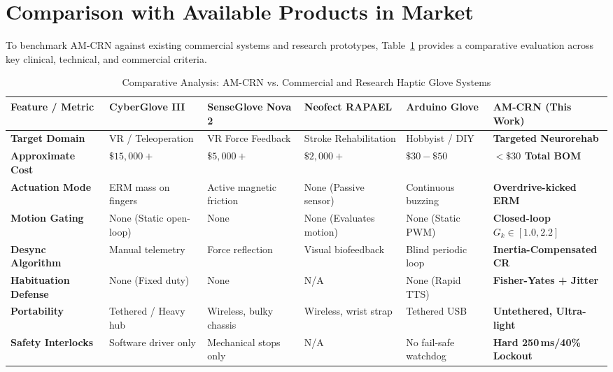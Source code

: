 \documentclass[10pt,twocolumn]{article}
\begin{document}
\section{Comparison with Available Products in Market}
To benchmark AM-CRN against existing commercial systems and research prototypes, Table~\ref{tab:market} provides a comparative evaluation across key clinical, technical, and commercial criteria.

\begin{table}[t]
\centering
\caption{Comparative Analysis: AM-CRN vs. Commercial and Research Haptic Glove Systems}
\label{tab:market}
\footnotesize
\begin{tabularx}{\textwidth}{l X X X X X}
\toprule
\textbf{Feature / Metric} & \textbf{CyberGlove III} & \textbf{SenseGlove Nova 2} & \textbf{Neofect RAPAEL} & \textbf{Arduino Glove} & \textbf{AM-CRN (This Work)} \\
\midrule
\textbf{Target Domain} & VR / Teleoperation & VR Force Feedback & Stroke Rehabilitation & Hobbyist / DIY & \textbf{Targeted Neurorehab} \\
\textbf{Approximate Cost} & $\$15,000+$ & $\$5,000+$ & $\$2,000+$ & $\$30 - \$50$ & \textbf{$<\$30$ Total BOM} \\
\textbf{Actuation Mode} & ERM mass on fingers & Active magnetic friction & None (Passive sensor) & Continuous buzzing & \textbf{Overdrive-kicked ERM} \\
\textbf{Motion Gating} & None (Static open-loop) & None & None (Evaluates motion) & None (Static PWM) & \textbf{Closed-loop $G_k \in [1.0, 2.2]$} \\
\textbf{Desync Algorithm} & Manual telemetry & Force reflection & Visual biofeedback & Blind periodic loop & \textbf{Inertia-Compensated CR} \\
\textbf{Habituation Defense}& None (Fixed duty) & None & N/A & None (Rapid TTS) & \textbf{Fisher-Yates + Jitter} \\
\textbf{Portability} & Tethered / Heavy hub & Wireless, bulky chassis & Wireless, wrist strap & Tethered USB & \textbf{Untethered, Ultra-light} \\
\textbf{Safety Interlocks} & Software driver only & Mechanical stops only & N/A & No fail-safe watchdog & \textbf{Hard 250\,ms/40\% Lockout} \\
\bottomrule
\end{tabularx}
\end{table}
\end{document}
